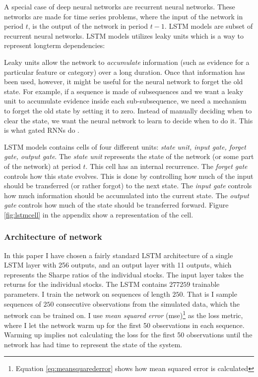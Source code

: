 A special case of deep neural networks are recurrent neural networks. These networks are made for time series problems, where the input of the network in period $t$, is the output of the network in period $t-1$. LSTM models are subset of recurrent neural networks. LSTM models utilizes leaky units which is a way to represent longterm dependencies:

\begin{displayquote}

Leaky units allow the network to \textit{accumulate} information (such as evidence for a particular feature or category) over a long duration. Once that information has been used, however, it might be useful for the neural network to forget the old state. For example, if a sequence is made of subsequences and we want a leaky unit to accumulate evidence inside each sub-subsequence, we need a mechanism to forget the old state by setting it to zero. Instead of manually deciding when to clear the state, we want the neural network to learn to decide when to do it. This is what gated RNNs do \cite{goodfellow_deep_2016}.
\end{displayquote}

LSTM models contains cells of four different units: \textit{state unit, input gate, forget gate, output gate}. The \textit{state unit} represents the state of the network (or some part of the network) at period $t$. This cell has an internal recurrence. The \textit{forget gate} controls how this state evolves. This is done by controlling how much of the input should be transferred (or rather forgot) to the next state. The \textit{input gate} controls how much information should be accumulated into the current state. The \textit{output gate} controls how much of the state should be transferred forward. Figure \ref{fig:lstmcell} in the appendix show a representation of the cell.

\subsubsection{Architecture of network}

In this paper I have chosen a fairly standard LSTM architecture of a single LSTM layer with 256 outputs, and an output layer with 11 outputs, which represents the Sharpe ratios of the individual stocks. The input layer takes the returns for the individual stocks. The LSTM contains $277259$ trainable parameters. I train the network on sequences of length $250$. That is I sample sequences of $250$ consecutive observations from the simulated data, which the network can be trained on. I use \textit{mean squared error} (mse)\footnote{Equation \ref{eq:meansquarederror} shows how mean squared error is calculated} as the loss metric, where I let the network warm up for the first 50 observations in each sequence. Warming up implies not calculating the loss for the first 50 observations until the network has had time to represent the state of the system.

